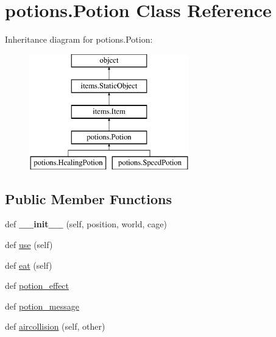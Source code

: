 \hypertarget{classpotions_1_1_potion}{}\section{potions.\+Potion Class Reference}
\label{classpotions_1_1_potion}
Inheritance diagram for potions.\+Potion\+:\begin{figure}[H]
\begin{center}
\leavevmode
\includegraphics[height=5.000000cm]{classpotions_1_1_potion}
\end{center}
\end{figure}
\subsection*{Public Member Functions}
\begin{DoxyCompactItemize}
\item 
\hypertarget{classpotions_1_1_potion_aaf05467102aba6f7954f97232468506b}{}def {\bfseries \+\_\+\+\_\+init\+\_\+\+\_\+} (self, position, world, cage)\label{classpotions_1_1_potion_aaf05467102aba6f7954f97232468506b}

\item 
def \hyperlink{classpotions_1_1_potion_afaec7f50b484e87a8e2c255a8f6dc565}{use} (self)
\item 
def \hyperlink{classpotions_1_1_potion_a082b478492f47aef9e5624f0d0a427c6}{eat} (self)
\item 
def \hyperlink{classpotions_1_1_potion_a2f6adc2903e82f177569c1da57281b67}{potion\+\_\+effect}
\item 
def \hyperlink{classpotions_1_1_potion_a16aa26fa350447dcd78d6aae959ff549}{potion\+\_\+message}
\item 
def \hyperlink{classpotions_1_1_potion_a6413bb332782ac6a5b084771fa19321a}{aircollision} (self, other)
\end{DoxyCompactItemize}
